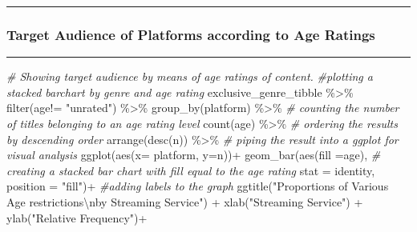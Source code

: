 \documentclass[
]{article}
\newenvironment{Shaded}{\begin{snugshade}}{\end{snugshade}}
\newcommand{\AttributeTok}[1]{\textcolor[rgb]{0.77,0.63,0.00}{#1}}
\newcommand{\CommentTok}[1]{\textcolor[rgb]{0.56,0.35,0.01}{\textit{#1}}}
\newcommand{\FunctionTok}[1]{\textcolor[rgb]{0.00,0.00,0.00}{#1}}
\newcommand{\NormalTok}[1]{#1}
\newcommand{\SpecialCharTok}[1]{\textcolor[rgb]{0.00,0.00,0.00}{#1}}
\newcommand{\StringTok}[1]{\textcolor[rgb]{0.31,0.60,0.02}{#1}}
\begin{document}
\begin{center}\rule{0.5\linewidth}{0.5pt}\end{center}

\hypertarget{target-audience-of-platforms-according-to-age-ratings}{%
\subsubsection{Target Audience of Platforms according to Age
Ratings}\label{target-audience-of-platforms-according-to-age-ratings}}

\begin{center}\rule{0.5\linewidth}{0.5pt}\end{center}

\begin{Shaded}
\begin{Highlighting}[]
\CommentTok{\# Showing target audience by means of age ratings of content. }
\CommentTok{\#plotting a stacked barchart by genre and age rating}
\NormalTok{exclusive\_genre\_tibble }\SpecialCharTok{\%\textgreater{}\%} 
  \FunctionTok{filter}\NormalTok{(age}\SpecialCharTok{!=} \StringTok{"unrated"}\NormalTok{) }\SpecialCharTok{\%\textgreater{}\%} 
  \FunctionTok{group\_by}\NormalTok{(platform) }\SpecialCharTok{\%\textgreater{}\%} 
  \CommentTok{\# counting the number of titles belonging to an age rating level}
  \FunctionTok{count}\NormalTok{(age) }\SpecialCharTok{\%\textgreater{}\%} 
  \CommentTok{\# ordering the results by descending order}
  \FunctionTok{arrange}\NormalTok{(}\FunctionTok{desc}\NormalTok{(n)) }\SpecialCharTok{\%\textgreater{}\%} 
  \CommentTok{\# piping the result into a ggplot for visual analysis}
  \FunctionTok{ggplot}\NormalTok{(}\FunctionTok{aes}\NormalTok{(}\AttributeTok{x=}\NormalTok{ platform, }\AttributeTok{y=}\NormalTok{n))}\SpecialCharTok{+}
  \FunctionTok{geom\_bar}\NormalTok{(}\FunctionTok{aes}\NormalTok{(}\AttributeTok{fill =}\NormalTok{age), }
           \CommentTok{\# creating a stacked bar chart with fill equal to the age rating}
           \AttributeTok{stat =} \StringTok{\textquotesingle{}identity\textquotesingle{}}\NormalTok{, }
           \AttributeTok{position =} \StringTok{"fill"}\NormalTok{)}\SpecialCharTok{+}
  \CommentTok{\#adding labels to the graph}
  \FunctionTok{ggtitle}\NormalTok{(}\StringTok{"Proportions of Various Age restrictions}\SpecialCharTok{\textbackslash{}n}\StringTok{by Streaming Service"}\NormalTok{) }\SpecialCharTok{+}
  \FunctionTok{xlab}\NormalTok{(}\StringTok{"Streaming Service"}\NormalTok{) }\SpecialCharTok{+} 
  \FunctionTok{ylab}\NormalTok{(}\StringTok{"Relative Frequency"}\NormalTok{)}\SpecialCharTok{+}

\end{Highlighting}
\end{Shaded}
\end{document}
